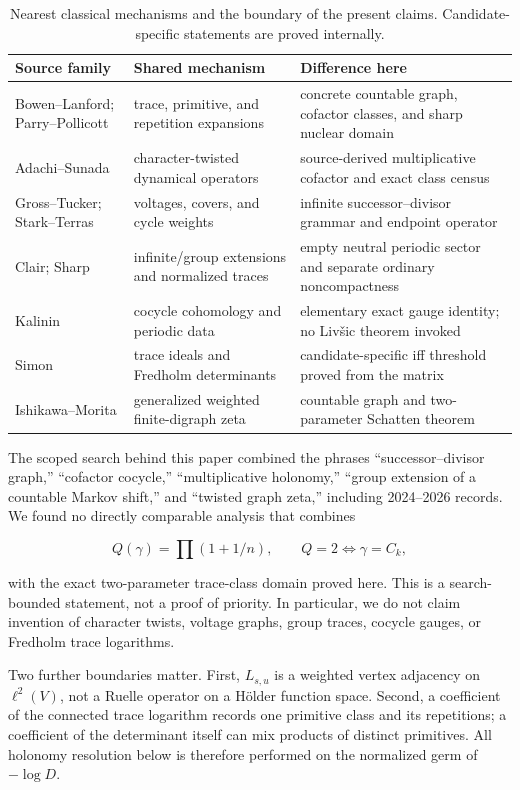 \begin{table}[t]
\centering
\small
\caption{Nearest classical mechanisms and the boundary of the present
claims.  Candidate-specific statements are proved internally.}
\label{tab:literature}
\begin{tabularx}{\textwidth}{L{0.26\textwidth}YY}
\toprule
Source family & Shared mechanism & Difference here \\
\midrule
Bowen--Lanford; Parry--Pollicott
& trace, primitive, and repetition expansions
& concrete countable graph, cofactor classes, and sharp nuclear domain \\
Adachi--Sunada
& character-twisted dynamical operators
& source-derived multiplicative cofactor and exact class census \\
Gross--Tucker; Stark--Terras
& voltages, covers, and cycle weights
& infinite successor--divisor grammar and endpoint operator \\
Clair; Sharp
& infinite/group extensions and normalized traces
& empty neutral periodic sector and separate ordinary noncompactness \\
Kalinin
& cocycle cohomology and periodic data
& elementary exact gauge identity; no Livšic theorem invoked \\
Simon
& trace ideals and Fredholm determinants
& candidate-specific iff threshold proved from the matrix \\
Ishikawa--Morita
& generalized weighted finite-digraph zeta
& countable graph and two-parameter Schatten theorem \\
\bottomrule
\end{tabularx}
\end{table}

The scoped search behind this paper combined the phrases
``successor--divisor graph,'' ``cofactor cocycle,'' ``multiplicative
holonomy,'' ``group extension of a countable Markov shift,'' and ``twisted
graph zeta,'' including 2024--2026 records.  We found no directly comparable
analysis that combines

\[
 Q(\gamma)=\prod(1+1/n),
 \qquad Q=2\iff\gamma=C_k,
\]

with the exact two-parameter trace-class domain proved here.  This is a
search-bounded statement, not a proof of priority.  In particular, we do not
claim invention of character twists, voltage graphs, group traces, cocycle
gauges, or Fredholm trace logarithms.

Two further boundaries matter.  First, \(L_{s,u}\) is a weighted vertex
adjacency on \(\ell^2(V)\), not a Ruelle operator on a Hölder function space.
Second, a coefficient of the connected trace logarithm records one primitive
class and its repetitions; a coefficient of the determinant itself can mix
products of distinct primitives.  All holonomy resolution below is therefore
performed on the normalized germ of \(-\log D\).

